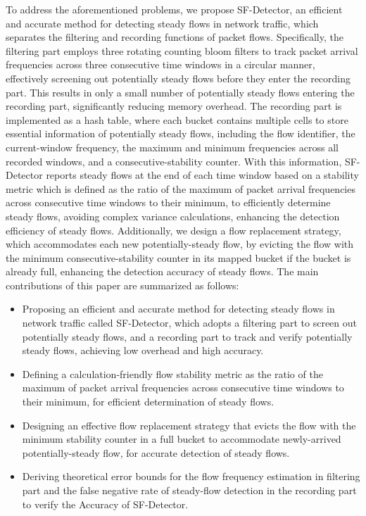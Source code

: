 \documentclass[preprint,12pt]{elsarticle}
\begin{document}
To address the aforementioned problems, we propose SF-Detector, an efficient and accurate method for detecting steady flows in network traffic, which separates the filtering and recording functions of packet flows. Specifically, the filtering part employs three rotating counting bloom filters to track packet arrival frequencies across three consecutive time windows in a circular manner, effectively screening out potentially steady flows before they enter the recording part. This results in only a small number of potentially steady flows entering the recording part, significantly reducing memory overhead. The recording part is implemented as a hash table, where each bucket contains multiple cells to store essential information of potentially steady flows, including the flow identifier, the current-window frequency, the maximum and minimum frequencies across all recorded windows, and a consecutive-stability counter. With this information, SF-Detector reports steady flows at the end of each time window based on a stability metric which is defined as the ratio of the maximum of packet arrival frequencies across consecutive time windows to their minimum, to efficiently determine steady flows, avoiding complex variance calculations, enhancing the detection efficiency of steady flows. Additionally, we design a flow replacement strategy, which accommodates each new potentially-steady flow, by evicting the flow with the minimum consecutive-stability counter in its mapped bucket if the bucket is already full, enhancing the detection accuracy of steady flows. The main contributions of this paper are summarized as follows:
\begin{itemize}
    \item Proposing an efficient and accurate method for detecting steady flows in network traffic called SF-Detector, which adopts a filtering part to screen out potentially steady flows, and a recording part to track and verify potentially steady flows, achieving low overhead and high accuracy.
    \item Defining a calculation-friendly flow stability metric as the ratio of the maximum of packet arrival frequencies across consecutive time windows to their minimum, for efficient determination of steady flows.
    \item Designing an effective flow replacement strategy that evicts the flow with the minimum stability counter in a full bucket to accommodate newly-arrived potentially-steady flow, for accurate detection of steady flows.
    \item Deriving theoretical error bounds for the flow frequency estimation in filtering part and the false negative rate of steady-flow detection in the recording part to verify the Accuracy of SF-Detector.
\end{itemize}
\end{document}
